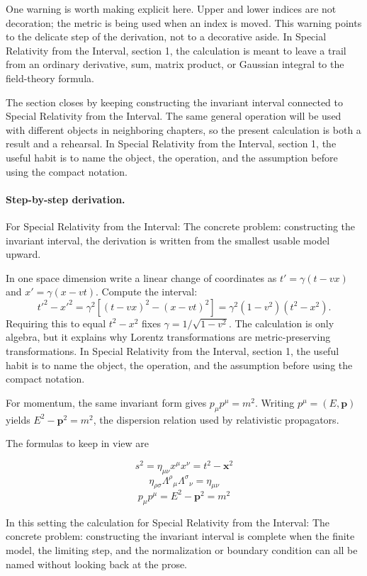 One warning is worth making explicit here.  Upper and lower indices are not decoration; the metric is being used when an index is moved.  This warning points to the delicate step of the derivation, not to a decorative aside.  In Special Relativity from the Interval, section 1, the calculation is meant to leave a trail from an ordinary derivative, sum, matrix product, or Gaussian integral to the field-theory formula.

The section closes by keeping constructing the invariant interval connected to Special Relativity from the Interval.  The same general operation will be used with different objects in neighboring chapters, so the present calculation is both a result and a rehearsal.  In Special Relativity from the Interval, section 1, the useful habit is to name the object, the operation, and the assumption before using the compact notation.



\paragraph{Step-by-step derivation.}

For Special Relativity from the Interval: The concrete problem: constructing the invariant interval, the derivation is written from the smallest usable model upward.

In one space dimension write a linear change of coordinates as \(t'=\gamma(t-vx)\) and \(x'=\gamma(x-vt)\).  Compute the interval:
\[
  t'^2-x'^2
  =
  \gamma^2[(t-vx)^2-(x-vt)^2]
  =
  \gamma^2(1-v^2)(t^2-x^2).
\]
Requiring this to equal \(t^2-x^2\) fixes \(\gamma=1/\sqrt{1-v^2}\).  The calculation is only algebra, but it explains why Lorentz transformations are metric-preserving transformations.  In Special Relativity from the Interval, section 1, the useful habit is to name the object, the operation, and the assumption before using the compact notation.

For momentum, the same invariant form gives \(p_\mu p^\mu=m^2\).  Writing \(p^\mu=(E,\bm p)\) yields \(E^2-\bm p^2=m^2\), the dispersion relation used by relativistic propagators.

The formulas to keep in view are

\[
  s^2=\eta_{\mu\nu}x^\mu x^\nu=t^2-\bm x^2
\]
\[
  \eta_{\rho\sigma}\Lambda^\rho{}_\mu\Lambda^\sigma{}_\nu=\eta_{\mu\nu}
\]
\[
  p_\mu p^\mu=E^2-\bm p^2=m^2
\]

In this setting the calculation for Special Relativity from the Interval: The concrete problem: constructing the invariant interval is complete when the finite model, the limiting step, and the normalization or boundary condition can all be named without looking back at the prose.




